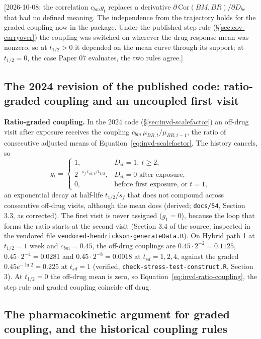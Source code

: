 \documentclass[11pt]{article}
\newcommand{\note}[1]{\textcolor{blue!60!black}{\small [#1]}}
\newcommand{\code}[1]{\texttt{#1}}
\begin{document}
\note{2026-10-08: the correlation $c_{bm} g_t$
replaces a derivative $\partial\,\mathrm{Cor}(BM,BR)/\partial D_{bc}$
that had no defined meaning. The independence from the trajectory
holds for the graded coupling now in the package. Under the published
step rule (\S\ref{sec:cov-carryover}) the coupling was switched on
wherever the drug-response mean was nonzero, so at $t_{1/2} > 0$ it
depended on the mean curve through its support; at $t_{1/2} = 0$, the
case Paper 07 evaluates, the two rules agree.}

\subsection{The 2024 revision of the published code: ratio-graded
coupling and an uncoupled first visit}
\label{sec:invd-ce-2024}

\textbf{Ratio-graded coupling.} In the 2024 code
(\S\ref{sec:invd-scalefactor}) an off-drug visit after exposure
receives the coupling $c_{bm}\,\mu_{BR,t}/\mu_{BR,t-1}$, the ratio of
consecutive adjusted means of Equation~\eqref{eq:invd-scalefactor}. The
history cancels, so
\begin{equation}
g_t = \begin{cases}
  1, & D_{it} = 1,\ t \ge 2, \\
  2^{-s_f\, t_{sd,t}/t_{1/2}}, & D_{it} = 0 \text{ after exposure}, \\
  0, & \text{before first exposure, or } t = 1,
\end{cases}
\label{eq:invd-ratio-coupling}
\end{equation}
an exponential decay at half-life $t_{1/2}/s_f$ that does not compound
across consecutive off-drug visits, although the mean does (derived;
\code{docs/54}, Section 3.3, as corrected). The
first visit is never assigned ($g_1 = 0$), because the loop that forms
the ratio starts at the second visit (Section 3.4 of the source;
inspected in the vendored file
\code{vendored-\allowbreak hendrickson-\allowbreak generateData.R}). On Hybrid
path 1 at $t_{1/2} = 1$ week and $c_{bm} = 0.45$, the off-drug
couplings are $0.45 \cdot 2^{-2} = 0.1125$, $0.45 \cdot 2^{-4} =
0.0281$ and $0.45 \cdot 2^{-8} = 0.0018$ at $t_{sd} = 1, 2, 4$, against
the graded $0.45 e^{-\ln 2} = 0.225$ at $t_{sd} = 1$ (verified,
\code{check-stress-test-construct.R}, Section 3). At $t_{1/2} = 0$ the off-drug mean
is zero, so Equation~\eqref{eq:invd-ratio-coupling}, the step rule and
graded coupling coincide off drug.

\subsection{The pharmacokinetic argument for graded coupling, and the
historical coupling rules}
\label{sec:inva-pk}
\end{document}
